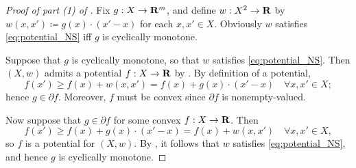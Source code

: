 \documentclass[11pt,letterpaper,reqno,oneside]{article}
\begin{document}
\begin{proof}[Proof of part (1) of ]
	Fix $g : X \to \mathbf{R}^m$, and define $w : X^2 \to \mathbf{R}$ by $w(x,x') \coloneqq g(x) \cdot (x'-x)$ for each $x,x' \in X$. Obviously $w$ satisfies \eqref{eq:potential_NS} iff $g$ is cyclically monotone.

	Suppose that $g$ is cyclically monotone, so that $w$ satisfies \eqref{eq:potential_NS}. Then $(X,w)$ admits a potential $f : X \to \mathbf{R}$ by . By definition of a potential,
	\begin{equation*}
		f(x') 
		\geq f(x) + w(x,x')
		= f(x) + g(x) \cdot (x'-x)
		\quad\forall x,x' \in X ;
	\end{equation*}
	hence $g \in \partial f$. Moreover, $f$ must be convex since $\partial f$ is nonempty-valued.

	Now suppose that $g \in \partial f$ for some convex $f : X \to \mathbf{R}$. Then
	\begin{equation*}
		f(x') 
		\geq f(x) + g(x) \cdot (x'-x)
		= f(x) + w(x,x')
		\quad\forall x,x' \in X ,
	\end{equation*}
	so $f$ is a potential for $(X,w)$. By , it follows that $w$ satisfies \eqref{eq:potential_NS}, and hence $g$ is cyclically monotone.
\end{proof}
\end{document}
